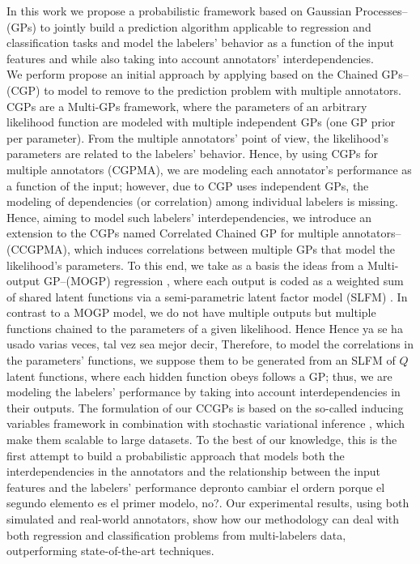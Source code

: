 \documentclass[journal]{IEEEtran}
\newcommand{\comment}[2]{{\color{blue}#1} {\color{red}#2}}
\begin{document}
In this work we propose a probabilistic framework based on Gaussian
Processes--(GPs) to jointly build a prediction algorithm applicable to
regression and classification tasks and model the labelers' behavior
as a function of the input features \comment{and}{while also} taking
into account annotators' interdependencies.\\
We \comment{perform}{propose} an initial approach \comment{by
  applying}{based on} the Chained GPs--(CGP) \cite{saul2016chained}
\comment{}{to} model \comment{to}{remove to} the prediction problem
with multiple annotators. CGPs are a Multi-GPs framework, where the
parameters of an arbitrary likelihood function are modeled with
multiple independent GPs (one GP prior per parameter). From the
multiple annotators' point of view, the likelihood's parameters are
related to the labelers' behavior. Hence, by using CGPs for multiple
annotators (CGPMA), we are modeling each annotator's performance as a
function of the input; however, due to CGP uses independent GPs, the
modeling of dependencies (or correlation) among individual labelers is
missing.\\ Hence, aiming to model such labelers' interdependencies, we
introduce an extension to the CGPs named Correlated Chained GP for
multiple annotators--(CCGPMA), which induces correlations between
multiple GPs that model the likelihood's parameters. To this end, we
take as a basis the ideas from a Multi-output GP--(MOGP) regression
\cite{alvarez2012kernels}, where each output is coded as a weighted
sum of shared latent functions via a semi-parametric latent factor
model (SLFM) \cite{teh2005semiparametric}. In contrast to a MOGP
model, we do not have multiple outputs but multiple functions chained
to the parameters of a given likelihood. \comment{Hence}{Hence ya se ha usado varias veces, tal vez sea mejor decir, Therefore}, to model the
correlations in the parameters' functions, we suppose them to be
generated from an SLFM of $Q$ latent functions, where each hidden
function \comment{obeys}{follows} a GP; thus, we are modeling the labelers' performance
by taking into account interdependencies in their outputs. The
formulation of our CCGPs is based on the so-called inducing variables
framework \cite{alvarez2010efficient} in combination with stochastic
variational inference \cite{hoffman2013stochastic}, which make them
scalable to large datasets. To the best of our knowledge, this is the
first attempt to build a probabilistic approach that models \comment{both the
interdependencies in the annotators and the relationship between the
input features and the labelers' performance}{depronto cambiar el ordern porque el segundo elemento es el primer modelo, no?}. Our experimental
results, using both simulated and real-world annotators, show how our
methodology can deal with both regression and classification problems
from multi-labelers data, outperforming state-of-the-art techniques.
\end{document}
